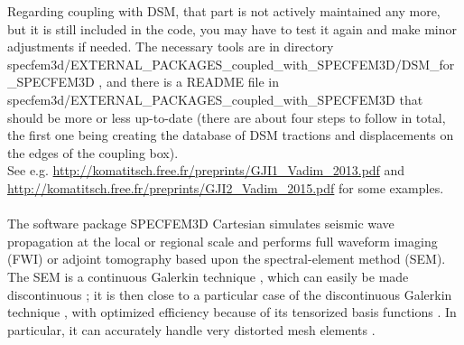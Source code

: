 Regarding coupling with DSM, that part is not actively maintained any more, but it is still included in the code, you may have to test it again and make minor adjustments if needed. The necessary tools are in directory specfem3d/EXTERNAL\_PACKAGES\_coupled\_with\_SPECFEM3D/DSM\_for\_SPECFEM3D , and there is a README file in specfem3d/EXTERNAL\_PACKAGES\_coupled\_with\_SPECFEM3D that should be more or less up-to-date (there are about four steps to follow in total, the first one being creating the database of DSM tractions and displacements on the edges of the coupling box). \\
See e.g. \url{http://komatitsch.free.fr/preprints/GJI1_Vadim_2013.pdf} and \url{http://komatitsch.free.fr/preprints/GJI2_Vadim_2015.pdf} for some examples.\\

\\

The software package SPECFEM3D Cartesian simulates seismic wave propagation
at the local or regional scale and performs full waveform imaging (FWI) or adjoint tomography based upon the spectral-element method
(SEM). The SEM is a continuous Galerkin technique \citep{TrKoLi08,PeKoLuMaLeCaLeMaLiBlNiBaTr11},
which can easily be made discontinuous \citep{BeMaPa94,Ch00,KoWoHu02,ChCaVi03,LaWaBe05,Kop06,WiStBuGh10,AcKo11};
it is then close to a particular case of the discontinuous Galerkin
technique \citep{ReHi73,LeRa74,Arn82,JoPi86,BoMaHe91,FaRi99,HuHuRa99,CoKaSh00,GiHeWa02,RiWh03,MoRi05,GrScSc06,AiMoMu06,BeLaPi06,DuKa06,DeSeWh08,PuAmKa09,WiStBuGh10,DeSe10,EtChViGl10},
with optimized efficiency because of its tensorized basis functions
\citep{WiStBuGh10,AcKo11}. In particular, it can accurately handle
very distorted mesh elements \citep{OlSe11}.\\

